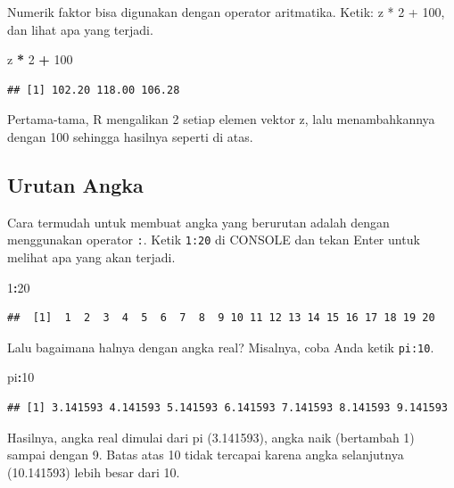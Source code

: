 \documentclass[openany]{book}
\newenvironment{Shaded}{\begin{snugshade}}{\end{snugshade}}
\newcommand{\DecValTok}[1]{\textcolor[rgb]{0.00,0.00,0.81}{#1}}
\newcommand{\StringTok}[1]{\textcolor[rgb]{0.31,0.60,0.02}{#1}}
\newcommand{\OperatorTok}[1]{\textcolor[rgb]{0.81,0.36,0.00}{\textbf{#1}}}
\newcommand{\NormalTok}[1]{#1}
\begin{document}
Numerik faktor bisa digunakan dengan operator aritmatika. Ketik: z * 2 +
100, dan lihat apa yang terjadi.

\begin{Shaded}
\begin{Highlighting}[]
\NormalTok{z }\OperatorTok{*}\StringTok{ }\DecValTok{2} \OperatorTok{+}\StringTok{ }\DecValTok{100}
\end{Highlighting}
\end{Shaded}

\begin{verbatim}
## [1] 102.20 118.00 106.28
\end{verbatim}

Pertama-tama, R mengalikan 2 setiap elemen vektor z, lalu menambahkannya
dengan 100 sehingga hasilnya seperti di atas.

\subsection{Urutan Angka}\label{urutan-angka}

Cara termudah untuk membuat angka yang berurutan adalah dengan
menggunakan operator \texttt{:}. Ketik \texttt{1:20} di CONSOLE dan
tekan Enter untuk melihat apa yang akan terjadi.

\begin{Shaded}
\begin{Highlighting}[]
\DecValTok{1}\OperatorTok{:}\DecValTok{20}
\end{Highlighting}
\end{Shaded}

\begin{verbatim}
##  [1]  1  2  3  4  5  6  7  8  9 10 11 12 13 14 15 16 17 18 19 20
\end{verbatim}

Lalu bagaimana halnya dengan angka real? Misalnya, coba Anda ketik
\texttt{pi:10}.

\begin{Shaded}
\begin{Highlighting}[]
\NormalTok{pi}\OperatorTok{:}\DecValTok{10}
\end{Highlighting}
\end{Shaded}

\begin{verbatim}
## [1] 3.141593 4.141593 5.141593 6.141593 7.141593 8.141593 9.141593
\end{verbatim}

Hasilnya, angka real dimulai dari pi (3.141593), angka naik (bertambah
1) sampai dengan 9. Batas atas 10 tidak tercapai karena angka
selanjutnya (10.141593) lebih besar dari 10.
\end{document}
